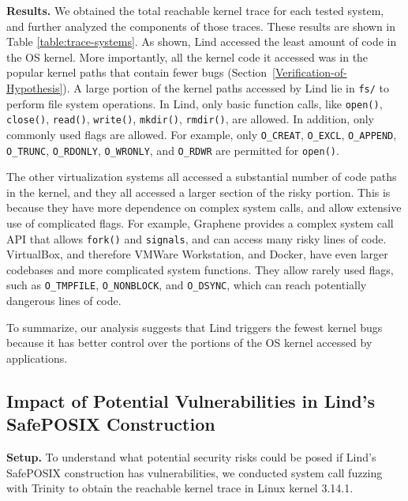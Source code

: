 {{\noindent
\textbf{Results.}
We obtained the total reachable kernel trace for
each tested system,
and further analyzed the components of those traces. These results
are shown in Table \ref{table:trace-systems}.
%
As shown, Lind accessed the least amount of code in the OS
kernel. More importantly, all the kernel code it accessed was in the
popular kernel paths that contain fewer bugs (Section~{\ref{Verification-of-Hypothesis}}).
A large portion of the kernel paths accessed by Lind lie in
\texttt{fs/} to perform file system operations.
In Lind, only basic function calls,
like \texttt{open()}, \texttt{close()}, \texttt{read()}, \texttt{write()}, \texttt{mkdir()},
\texttt{rmdir()}, are allowed. In addition, only commonly used flags are allowed. For example,
only \texttt{O\_CREAT}, \texttt{O\_EXCL}, \texttt{O\_APPEND}, \texttt{O\_TRUNC},
\texttt{O\_RDONLY}, \texttt{O\_WRONLY}, and \texttt{O\_RDWR} are permitted for \texttt{open()}.

The other virtualization systems all accessed a substantial number of code
paths in the kernel,
and they all accessed a larger section of the risky portion.
This is because they have
more dependence on complex system calls, and
allow extensive use of complicated flags. For example,
Graphene provides a complex system call API that allows
\texttt{fork()} and \texttt{signals}, and can access many risky lines of code.
VirtualBox, and therefore VMWare Workstation, and Docker, have even larger
codebases and more complicated system functions. They allow
rarely used flags, such as \texttt{O\_TMPFILE}, \texttt{O\_NONBLOCK},
and \texttt{O\_DSYNC}, which can reach potentially dangerous lines
of code.

To summarize, our analysis suggests that Lind triggers the fewest kernel bugs because
it has better control over the portions of the OS kernel accessed by applications.

\subsection{Impact of Potential Vulnerabilities in Lind's SafePOSIX Construction}
\label{Reachable-Kernel-Trace-Analysis-for-Repy-Sandbox}


\noindent
\textbf{Setup.}
To understand what potential security risks could be posed if Lind's SafePOSIX construction
has vulnerabilities, we conducted system call fuzzing with Trinity
to obtain the reachable kernel trace in Linux kernel 3.14.1.

}}
